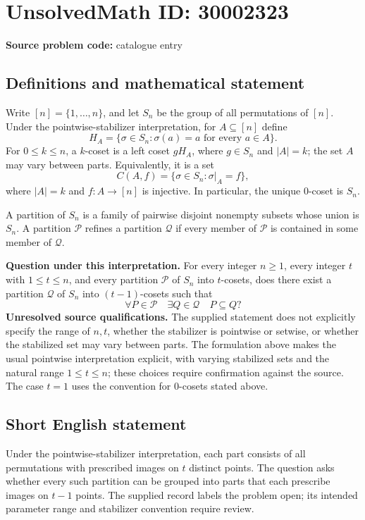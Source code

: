 \documentclass[11pt]{article}
\begin{document}
\section*{UnsolvedMath ID: 30002323}
\textbf{Source problem code:} catalogue entry
\subsection{Definitions and mathematical statement}
Write \([n]=\{1,\ldots,n\}\), and let \(S_n\) be the group of all permutations of \([n]\). Under the pointwise-stabilizer interpretation, for \(A\subseteq[n]\) define
\[
H_A=\{\sigma\in S_n:\sigma(a)=a\text{ for every }a\in A\}.
\]
For \(0\leq k\leq n\), a \(k\)-coset is a left coset \(gH_A\), where \(g\in S_n\) and \(|A|=k\); the set \(A\) may vary between parts. Equivalently, it is a set
\[
C(A,f)=\{\sigma\in S_n:\sigma|_A=f\},
\]
where \(|A|=k\) and \(f:A\to[n]\) is injective. In particular, the unique \(0\)-coset is \(S_n\).

A partition of \(S_n\) is a family of pairwise disjoint nonempty subsets whose union is \(S_n\). A partition \(\mathcal P\) refines a partition \(\mathcal Q\) if every member of \(\mathcal P\) is contained in some member of \(\mathcal Q\).

\textbf{Question under this interpretation.} For every integer \(n\geq1\), every integer \(t\) with \(1\leq t\leq n\), and every partition \(\mathcal P\) of \(S_n\) into \(t\)-cosets, does there exist a partition \(\mathcal Q\) of \(S_n\) into \((t-1)\)-cosets such that
\[
\forall P\in\mathcal P\quad\exists Q\in\mathcal Q\quad P\subseteq Q?
\]
\textbf{Unresolved source qualifications.} The supplied statement does not explicitly specify the range of \(n,t\), whether the stabilizer is pointwise or setwise, or whether the stabilized set may vary between parts. The formulation above makes the usual pointwise interpretation explicit, with varying stabilized sets and the natural range \(1\leq t\leq n\); these choices require confirmation against the source. The case \(t=1\) uses the convention for \(0\)-cosets stated above.
\subsection{Short English statement}
Under the pointwise-stabilizer interpretation, each part consists of all permutations with prescribed images on \(t\) distinct points. The question asks whether every such partition can be grouped into parts that each prescribe images on \(t-1\) points. The supplied record labels the problem open; its intended parameter range and stabilizer convention require review.
\end{document}
